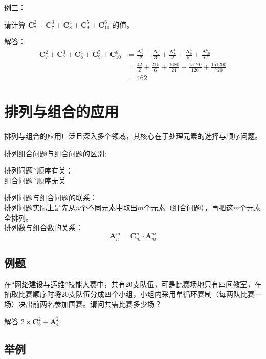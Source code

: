 \documentclass[a5paper]{article}
\begin{document}
{\color{blue} 例三：}{请计算 $\textbf{C}_{7}^{2}+\textbf{C}_{7}^{3}+\textbf{C}_{8}^{4}+\textbf{C}_{9}^{5}+\textbf{C}_{10}^{6}$ 的值。

{\color{blue} 解答：}
\begin{equation*}
    \begin{aligned}
        \textbf{C}_{7}^{2}+\textbf{C}_{7}^{3}+\textbf{C}_{8}^{4}+\textbf{C}_{9}^{5}+\textbf{C}_{10}^{6} &= \frac{\textbf{A}_{7}^{2}}{2!}+\frac{\textbf{A}_{7}^{3}}{3!}+\frac{\textbf{A}_{8}^{4}}{4!}+\frac{\textbf{A}_{9}^{5}}{5!}+\frac{\textbf{A}_{10}^6}{6!}\\
        &= \frac{42}{2}+\frac{215}{6}+\frac{1680}{24}+\frac{15120}{120}+\frac{151200}{720}\\
        &= 462
    \end{aligned}
\end{equation*}

\section{\textbf{排列与组合的应用}}

排列与组合的应用广泛且深入多个领域，其核心在于处理元素的选择与顺序问题。

排列组合问题与组合问题的区别;
\begin{center}
    排列问题 \~ 与顺序有关； \\
    组合问题 \~ 与顺序无关
\end{center}

排列问题与组合问题的联系：\\
排列问题实际上是先从$n$个不同元素中取出$m$个元素（组合问题），再把这$m$个元素全排列。\\
排列数与组合数的关系：\\
\begin{equation}
    \textbf{A}_{n}^m = \textbf{C}_{m}^n \cdot \textbf{A}_{m}^{m}
\end{equation}

\subsection{例题}
在“网络建设与运维”技能大赛中，共有20支队伍，可是比赛场地只有四间教室，在抽取比赛顺序时将20支队伍分成四个小组，小组内采用单循环赛制（每两队比赛一场）决出前两名参加国赛。请问共需比赛多少场？

{\color{blue} 解答} $2\times{}\textbf{C}_{8}^{2}+\textbf{A}_{4}^{2}$

\subsection{举例}

}
\end{document}
